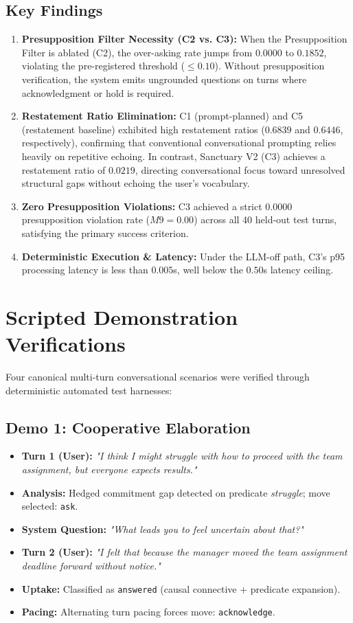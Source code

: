 \documentclass[11pt,a4paper]{article}
\begin{document}
\subsection{Key Findings}
\begin{enumerate}
    \item \textbf{Presupposition Filter Necessity (C2 vs. C3):}
    When the Presupposition Filter is ablated (C2), the over-asking rate jumps from $0.0000$ to \textbf{$0.1852$}, violating the pre-registered threshold ($\le 0.10$). Without presupposition verification, the system emits ungrounded questions on turns where acknowledgment or hold is required.
    \item \textbf{Restatement Ratio Elimination:}
    C1 (prompt-planned) and C5 (restatement baseline) exhibited high restatement ratios ($0.6839$ and $0.6446$, respectively), confirming that conventional conversational prompting relies heavily on repetitive echoing. In contrast, Sanctuary V2 (C3) achieves a restatement ratio of \textbf{$0.0219$}, directing conversational focus toward unresolved structural gaps without echoing the user's vocabulary.
    \item \textbf{Zero Presupposition Violations:}
    C3 achieved a strict $0.0000$ presupposition violation rate ($M9 = 0.00$) across all 40 held-out test turns, satisfying the primary success criterion.
    \item \textbf{Deterministic Execution \& Latency:}
    Under the LLM-off path, C3's p95 processing latency is less than $0.005$s, well below the $0.50$s latency ceiling.
\end{enumerate}

\section{Scripted Demonstration Verifications}

Four canonical multi-turn conversational scenarios were verified through deterministic automated test harnesses:

\subsection{Demo 1: Cooperative Elaboration}
\begin{itemize}
    \item \textbf{Turn 1 (User):} \emph{"I think I might struggle with how to proceed with the team assignment, but everyone expects results."}
    \item \textbf{Analysis:} Hedged commitment gap detected on predicate \emph{struggle}; move selected: \texttt{ask}.
    \item \textbf{System Question:} \emph{"What leads you to feel uncertain about that?"}
    \item \textbf{Turn 2 (User):} \emph{"I felt that because the manager moved the team assignment deadline forward without notice."}
    \item \textbf{Uptake:} Classified as \texttt{answered} (causal connective + predicate expansion).
    \item \textbf{Pacing:} Alternating turn pacing forces move: \texttt{acknowledge}.
\end{itemize}
\end{document}
